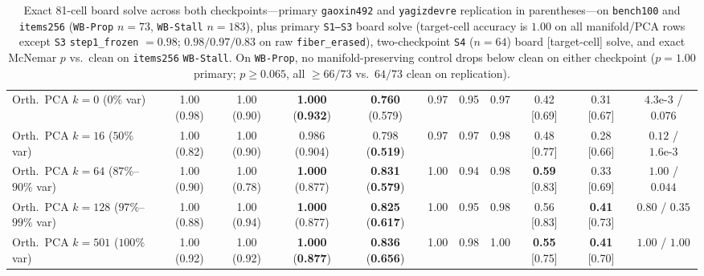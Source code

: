 \documentclass[10pt,letterpaper]{article}
\begin{document}
\begin{table}[t]
{\begin{tabular}{@{}lcccccccccc@{}}
\midrule
Orth.\ PCA $k=0$ ($0\%$ var) & 1.00 (0.98) & 1.00 (0.90) & \textbf{1.000} (\textbf{0.932}) & \textbf{0.760} (0.579) & 0.97 & 0.95 & 0.97 & 0.42 [0.69] & 0.31 [0.67] & $4.3\text{e-}3$ / $0.076$ \\
Orth.\ PCA $k=16$ ($50\%$ var) & 1.00 (0.82) & 1.00 (0.90) & 0.986 (0.904) & 0.798 (\textbf{0.519}) & 0.97 & 0.97 & 0.98 & 0.48 [0.77] & 0.28 [0.66] & $0.12$ / $1.6\text{e-}3$ \\
Orth.\ PCA $k=64$ ($87\%$--$90\%$ var) & 1.00 (0.90) & 1.00 (0.78) & \textbf{1.000} (0.877) & \textbf{0.831} (\textbf{0.579}) & 1.00 & 0.94 & 0.98 & \textbf{0.59} [0.83] & 0.33 [0.69] & $1.00$ / $0.044$ \\
Orth.\ PCA $k=128$ ($97\%$--$99\%$ var) & 1.00 (0.88) & 1.00 (0.94) & \textbf{1.000} (0.877) & \textbf{0.825} (\textbf{0.617}) & 1.00 & 0.95 & 0.98 & 0.56 [0.83] & \textbf{0.41} [0.73] & $0.80$ / $0.35$ \\
Orth.\ PCA $k=501$ ($100\%$ var) & 1.00 (0.92) & 1.00 (0.92) & \textbf{1.000} (\textbf{0.877}) & \textbf{0.836} (\textbf{0.656}) & 1.00 & 0.98 & 1.00 & \textbf{0.55} [0.75] & \textbf{0.41} [0.70] & $1.00$ / $1.00$ \\
\bottomrule
\end{tabular}%
}
\caption{Exact 81-cell board solve across both checkpoints—primary \texttt{gaoxin492} and \texttt{yagizdevre} replication in parentheses—on \texttt{bench100} and \texttt{items256} (\texttt{WB-Prop} $n=73$, \texttt{WB-Stall} $n=183$), plus primary \texttt{S1--S3} board solve (target-cell accuracy is $1.00$ on all manifold/PCA rows except \texttt{S3} \texttt{step1\_frozen} $=0.98$; $0.98/0.97/0.83$ on raw \texttt{fiber\_erased}), two-checkpoint \texttt{S4} ($n=64$) board [target-cell] solve, and exact McNemar $p$ vs.\ clean on \texttt{items256} \texttt{WB-Stall}. On \texttt{WB-Prop}, no manifold-preserving control drops below clean on either checkpoint ($p=1.00$ primary; $p \ge 0.065$, all $\ge 66/73$ vs.\ $64/73$ clean on replication).}
\label{tab:fiber_controls}
\end{table}
\end{document}
